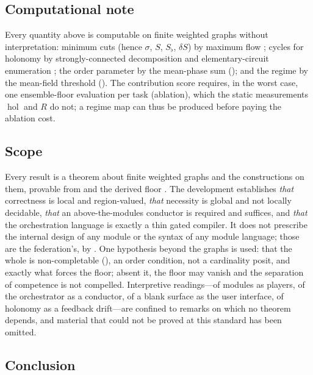 \documentclass[twocolumn,11pt,a4paper]{article}
\theoremstyle{sup}
\theoremstyle{definition}
\theoremstyle{remark}
\DeclareMathOperator{\hol}{hol}
\newcommand{\str}{\sigma}             %
\newcommand{\Sent}{S}                 %
\newcommand{\Sflat}{S_{\flat}}        %
\newcommand{\contrib}{\delta\Sent}    %
\newcommand{\Rens}{R}                 %
\begin{document}
\subsection{Computational note}

Every quantity above is computable on finite weighted graphs without
interpretation: minimum cuts (hence $\str$, $\Sent$, $\Sflat$, $\contrib$) by
maximum flow \citep{fordfulkerson1956,menger1927}; cycles for holonomy by
strongly-connected decomposition \citep{tarjan1972} and elementary-circuit
enumeration \citep{johnson1975}; the order parameter by the mean-phase sum
(); and the regime by the mean-field threshold
(). The contribution score requires, in the worst case, one
ensemble-floor evaluation per task (ablation), which the static measurements
$\hol$ and $\Rens$ do not; a regime map can thus be produced before paying the
ablation cost.

\subsection{Scope}

Every result is a theorem about finite weighted graphs and the constructions on
them, provable from  and the derived floor . The
development establishes \emph{that} correctness is local and region-valued,
\emph{that} necessity is global and not locally decidable, \emph{that} an
above-the-modules conductor is required and suffices, and \emph{that} the
orchestration language is exactly a thin gated compiler. It does not prescribe the
internal design of any module or the syntax of any module language; those are the
federation's, by . One hypothesis beyond the graphs is used:
that the whole is non-completable (), an order condition,
not a cardinality posit, and exactly what forces the floor; absent it, the floor
may vanish and the separation of competence is not compelled. Interpretive
readings---of modules as players, of the orchestrator as a conductor, of a blank
surface as the user interface, of holonomy as a feedback drift---are confined to
remarks on which no theorem depends, and material that could not be proved at this
standard has been omitted.

\subsection{Conclusion}
\end{document}
